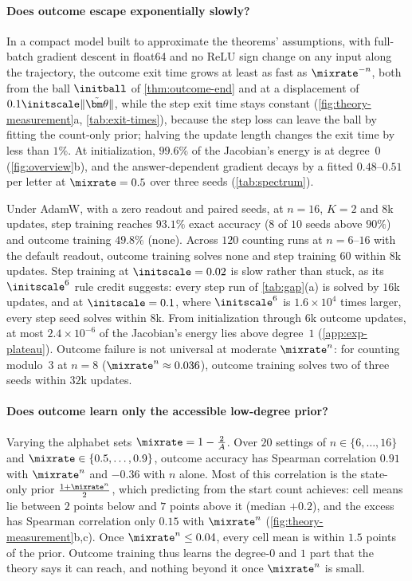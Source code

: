 \paragraph{Does outcome escape exponentially slowly?} In a compact model built to approximate the theorems' assumptions, with full-batch gradient descent
in float64 and no ReLU sign change on any input along the trajectory, the outcome exit time grows at least as fast as $\mixrate^{-n}$, both from the
ball $\initball$ of \cref{thm:outcome-end} and at a displacement of $0.1\initscale\|\tilde{\bm\theta}\|$, while the step exit time stays
constant (\cref{fig:theory-measurement}a, \cref{tab:exit-times}), because the step loss can leave the ball by fitting the count-only prior;
halving the update length changes the exit time by less than $1\%$. At
initialization, $99.6\%$ of the Jacobian's energy is at degree~$0$ (\cref{fig:overview}b), and the answer-dependent
gradient decays by a fitted $0.48$--$0.51$ per letter at $\mixrate=0.5$ over three seeds (\cref{tab:spectrum}).

Under AdamW, with a zero readout and paired seeds, at $n=16$, $K=2$ and $8$k updates, step training reaches
$93.1\%$ exact accuracy ($8$ of $10$ seeds above $90\%$) and outcome training $49.8\%$ (none). Across $120$ counting runs at
$n=6$--$16$ with the default readout, outcome training solves none and step training $60$ within $8$k updates. Step
training at $\initscale=0.02$ is slow rather than stuck, as its $\initscale^6$ rule credit suggests: every step run of
\cref{tab:gap}(a) is solved by $16$k updates, and at $\initscale=0.1$, where $\initscale^6$ is $1.6\times10^4$ times larger, every
step seed solves within $8$k. From initialization through $6$k outcome updates, at most $2.4\times10^{-6}$ of the Jacobian's
energy lies above degree~$1$ (\cref{app:exp-plateau}). Outcome failure is not universal at moderate $\mixrate^n$: for counting
modulo~$3$ at $n=8$ ($\mixrate^n\approx0.036$), outcome training solves two of three seeds within $32$k updates.

\paragraph{Does outcome learn only the accessible low-degree prior?} Varying the alphabet sets $\mixrate=1-\frac{2}{A}$. Over $20$ settings
of $n\in\{6,\ldots,16\}$ and $\mixrate\in\{0.5,\ldots,0.9\}$, outcome accuracy has Spearman correlation $0.91$ with
$\mixrate^n$ and $-0.36$ with $n$ alone. Most of this correlation is the state-only prior $\frac{1+\mixrate^n}{2}$, which predicting
from the start count achieves: cell means lie between $2$ points below and $7$ points above it (median $+0.2$), and the excess
has Spearman correlation only $0.15$ with $\mixrate^n$ (\cref{fig:theory-measurement}b,c). Once $\mixrate^n\le0.04$, every
cell mean is within $1.5$ points of the prior. Outcome training thus learns the
degree-$0$ and $1$ part that the theory says it can reach, and nothing beyond it once $\mixrate^n$ is small.

